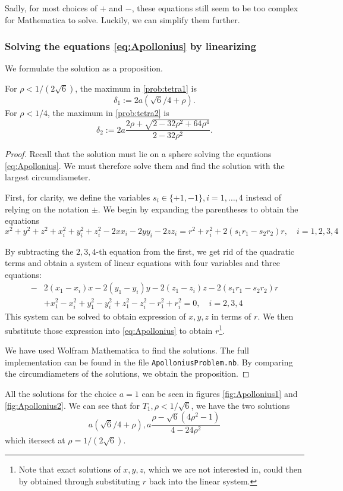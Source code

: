 Sadly, for most choices of $+$ and $-$, these equations still seem to be too complex for Mathematica to solve. Luckily, we can simplify them further. 

\subsubsection{Solving the equations \ref{eq:Apollonius} by linearizing}

We formulate the solution as a proposition.
\begin{proposition}\label{prop:Apollonius}
	For $\rho < 1/(2\sqrt 6)$, the maximum in \ref{prob:tetra1} is
	$$\delta_1 := 2a(\sqrt 6/4 + \rho).$$
	For $\rho < 1/4$, the maximum in \ref{prob:tetra2} is
	$$\delta_2 := 2a \frac{2\rho + \sqrt{2 - 32\rho^2 + 64 \rho^4}}{2-32\rho^2}.$$

\end{proposition}
\begin{proof}
	Recall that the solution must lie on a sphere solving the equations \ref{eq:Apollonius}. We must therefore solve them and find the solution with the largest circumdiameter.

First, for clarity, we define the variables $s_i\in\{+1,-1\},i=1,\dots,4$ instead of relying on the notation $\pm$. We begin by expanding the parentheses to obtain the equations
$$x^2+y^2+z^2 + x_i^2 + y_i^2 + z_i^2 - 2xx_i - 2yy_i - 2zz_i = r^2 + r_i^2 + 2(s_1 r_1 - s_2 r_2)r,\quad i=1,2,3,4$$

By subtracting the $2,3,4$-th equation from the first, we get rid of the quadratic terms and obtain a system of linear equations with four variables and three equations:
\begin{align*}-&2(x_1-x_i)x - 2(y_1-y_i)y -2 (z_1-z_i)z - 2(s_1r_1 - s_2r_2)r \\
	& + x_1^2-x_i^2 + y_1^2-y_i^2 + z_1^2 - z_i^2 -r_1^2 + r_i^2 = 0, \quad i=2,3,4
\end{align*}
This system can be solved to obtain expression of $x,y,z$ in terms of $r$. We then substitute those expression into \ref{eq:Apollonius} to obtain $r$\footnote{Note that exact solutions of $x,y,z$, which we are not interested in, could then by obtained through substituting $r$ back into the linear system.}. 

We have used Wolfram Mathematica \cite{Mathematica} to find the solutions. The full implementation can be found in the file \texttt{ApolloniusProblem.nb}. By comparing the circumdiameters of the solutions, we obtain the proposition.

\end{proof}
All the solutions for the choice $a=1$ can be seen in figures \ref{fig:Apollonius1} and \ref{fig:Apollonius2}. We can see that for $T_1, \rho < 1/\sqrt 6$, we have the two solutions
$$a(\sqrt 6 / 4 + \rho), a \frac{\rho - \sqrt 6 (4\rho^2 - 1)}{4-24 \rho^2}$$
which itersect at $\rho =1/(2\sqrt 6)$. 

